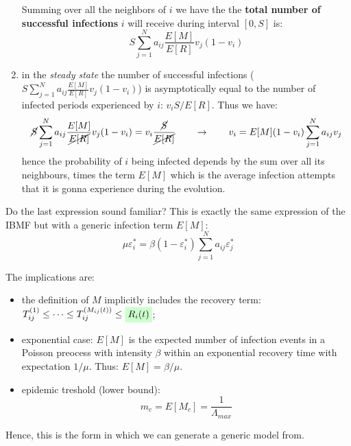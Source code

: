 \documentclass[../main/main.tex]{subfiles}
\begin{document}
\begin{enumerate}
Summing over all the neighbors of $i$ we have the the \textbf{total number of successful infections} \( i \) will receive during interval \( [0,S] \) is:
\begin{equation*}
  S \sum_{j=1}^{N}  a_{ij} \frac{E[M]}{E[R]} v_{j} (1-v_i)
\end{equation*}

\item in the \emph{steady state} the number of successful infections (\(  S \sum_{j=1}^{N}  a_{ij} \frac{E[M]}{E[R]} v_{j} (1-v_i) \)) is asymptotically equal to the number of infected periods experienced by \( i \): \( v_i S / E[R] \). Thus we have:
\begin{equation}
  \cancel{S} \sum_{j=1}^{N}  a_{ij} \frac{E[M]}{\cancel{E[R]}} v_{j} (1-v_i) = v_i \frac{\cancel{ S}}{\cancel{E[R]}} \qquad \rightarrow \qquad  v_i = E[M] (1- v_i) \sum_{j=1}^{N} a_{ij} v_j
\end{equation}
hence the probability of \( i \) being infected depends by the sum over all its neighbours, times the term \( E[M] \) which is the average infection attempts that it is gonna experience during the evolution.
\end{enumerate}

Do the last expression sound familiar? This is exactly the same expression of the IBMF but with a generic infection term \( E[M] \):
\begin{equation*}
  \mu \varepsilon _i^* = \beta ( 1 - \varepsilon _i^*) \sum_{j=1}^{N} a_{ij} \varepsilon _j^*
\end{equation*}

The implications are:
\begin{itemize}
\item the definition of \( M \) implicitly includes the recovery term: \( T_{ij}^{(1)} \le \dots \le T_{ij}^{(M_{ij}(t))} \le \mathcolorbox{green!20}{R_i (t)} \);
\item exponential case: \( E[M] \) is the expected number of infection events in a Poisson preocess with intensity \( \beta  \) within an exponential recovery time with expectation \( 1/ \mu  \). Thus: \( E[M] = \beta / \mu  \).
\item epidemic treshold (lower bound):
\begin{equation*}
  m_c = E[M_c] = \frac{1}{\Lambda _{max}}
\end{equation*}
\end{itemize}
Hence, this is the form in which we can generate a generic model from. 
\end{document}
